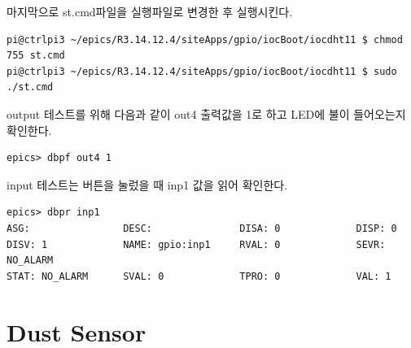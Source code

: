\documentclass[11pt
  , a4paper
  , article
  , oneside
]{memoir}
\begin{document}
마지막으로 st.cmd파일을 실행파일로 변경한 후 실행시킨다.
\begin{lstlisting}[style=termstyle]
pi@ctrlpi3 ~/epics/R3.14.12.4/siteApps/gpio/iocBoot/iocdht11 $ chmod 755 st.cmd
pi@ctrlpi3 ~/epics/R3.14.12.4/siteApps/gpio/iocBoot/iocdht11 $ sudo ./st.cmd
\end{lstlisting}
output 테스트를 위해 다음과 같이 out4 출력값을 1로 하고 LED에 불이 들어오는지 확인한다.
\begin{lstlisting}[style=termstyle]
epics> dbpf out4 1
\end{lstlisting}
input 테스트는 버튼을 눌렀을 때 inp1 값을 읽어 확인한다.
\begin{lstlisting}[style=termstyle]
epics> dbpr inp1
ASG:                DESC:               DISA: 0             DISP: 0             
DISV: 1             NAME: gpio:inp1     RVAL: 0             SEVR: NO_ALARM      
STAT: NO_ALARM      SVAL: 0             TPRO: 0             VAL: 1
\end{lstlisting}
\section{Dust Sensor}
\end{document}
